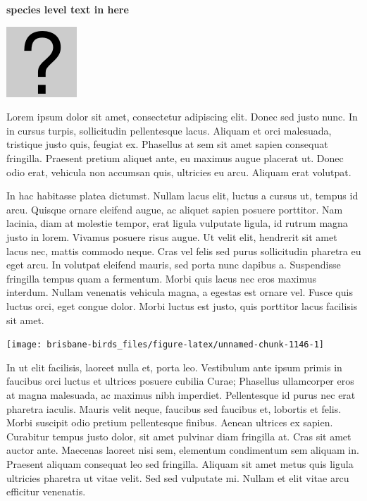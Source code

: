 \documentclass[]{book}
\let\origfigure\figure
\let\endorigfigure\endfigure
\renewenvironment{figure}[1][2] {
  \expandafter\origfigure\expandafter[H]
} {
  \endorigfigure
}
\begin{document}
\textbf{species level text in here}

\begin{figure}
\centering
\includegraphics{assets/missing.png}
\caption{No image for species}
\end{figure}

Lorem ipsum dolor sit amet, consectetur adipiscing elit. Donec sed justo
nunc. In in cursus turpis, sollicitudin pellentesque lacus. Aliquam et
orci malesuada, tristique justo quis, feugiat ex. Phasellus at sem sit
amet sapien consequat fringilla. Praesent pretium aliquet ante, eu
maximus augue placerat ut. Donec odio erat, vehicula non accumsan quis,
ultricies eu arcu. Aliquam erat volutpat.

In hac habitasse platea dictumst. Nullam lacus elit, luctus a cursus ut,
tempus id arcu. Quisque ornare eleifend augue, ac aliquet sapien posuere
porttitor. Nam lacinia, diam at molestie tempor, erat ligula vulputate
ligula, id rutrum magna justo in lorem. Vivamus posuere risus augue. Ut
velit elit, hendrerit sit amet lacus nec, mattis commodo neque. Cras vel
felis sed purus sollicitudin pharetra eu eget arcu. In volutpat eleifend
mauris, sed porta nunc dapibus a. Suspendisse fringilla tempus quam a
fermentum. Morbi quis lacus nec eros maximus interdum. Nullam venenatis
vehicula magna, a egestas est ornare vel. Fusce quis luctus orci, eget
congue dolor. Morbi luctus est justo, quis porttitor lacus facilisis sit
amet.

\begin{figure}
\texttt{[image: brisbane-birds\_files/figure-latex/unnamed-chunk-1146-1]} \caption{insert figure caption}\label{fig:unnamed-chunk-1146}
\end{figure}

In ut elit facilisis, laoreet nulla et, porta leo. Vestibulum ante ipsum
primis in faucibus orci luctus et ultrices posuere cubilia Curae;
Phasellus ullamcorper eros at magna malesuada, ac maximus nibh
imperdiet. Pellentesque id purus nec erat pharetra iaculis. Mauris velit
neque, faucibus sed faucibus et, lobortis et felis. Morbi suscipit odio
pretium pellentesque finibus. Aenean ultrices ex sapien. Curabitur
tempus justo dolor, sit amet pulvinar diam fringilla at. Cras sit amet
auctor ante. Maecenas laoreet nisi sem, elementum condimentum sem
aliquam in. Praesent aliquam consequat leo sed fringilla. Aliquam sit
amet metus quis ligula ultricies pharetra ut vitae velit. Sed sed
vulputate mi. Nullam et elit vitae arcu efficitur venenatis.
\end{document}
